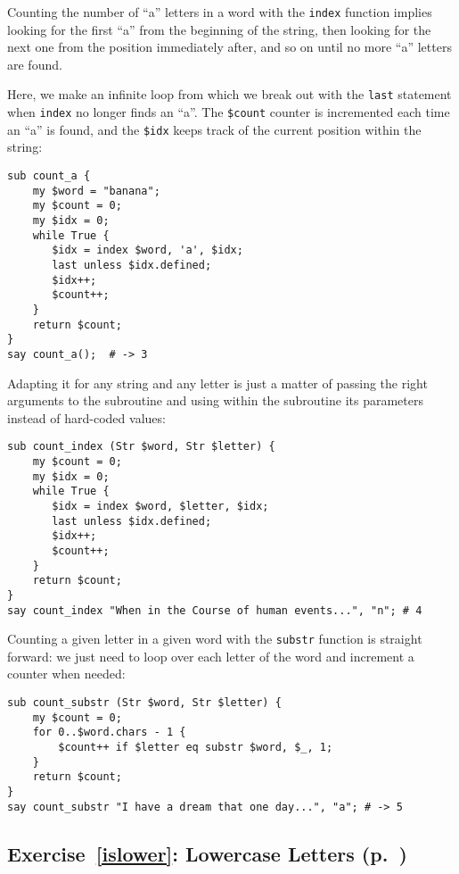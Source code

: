 Counting the number of ``a'' letters in a word with the {\tt index} 
function implies looking for the first ``a'' from the 
beginning of the string, then looking for the next one 
from the position immediately after, and so on until no 
more ``a'' letters are found.

Here, we make an infinite loop from which we break out with 
the {\tt last} statement when {\tt index} no longer finds 
an ``a''. The {\tt \$count} counter is incremented each time 
an ``a'' is found, and the {\tt \$idx} keeps track of the 
current position within the string:

\begin{verbatim}
sub count_a {
    my $word = "banana";
    my $count = 0;
    my $idx = 0;
    while True {
       $idx = index $word, 'a', $idx;
       last unless $idx.defined;
       $idx++;
       $count++;
    }
    return $count;
}
say count_a();  # -> 3
\end{verbatim}

Adapting it for any string and any letter is just a matter 
of passing the right arguments to the subroutine and using 
within the subroutine its parameters instead of hard-coded 
values:

\begin{verbatim}
sub count_index (Str $word, Str $letter) {
    my $count = 0;
    my $idx = 0;
    while True {
       $idx = index $word, $letter, $idx;
       last unless $idx.defined;
       $idx++;
       $count++;
    }
    return $count;
}
say count_index "When in the Course of human events...", "n"; # 4
\end{verbatim}

Counting a given letter in a given word with the {\tt substr} 
function is straight forward: we just need to loop over 
each letter of the word and increment a counter when needed:

\begin{verbatim}
sub count_substr (Str $word, Str $letter) {
    my $count = 0;
    for 0..$word.chars - 1 {
        $count++ if $letter eq substr $word, $_, 1;
    }
    return $count;
}
say count_substr "I have a dream that one day...", "a"; # -> 5
\end{verbatim}

\subsection{Exercise~\ref{islower}: Lowercase Letters (p.~\pageref{islower})}
\label{sol_islower}

